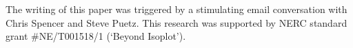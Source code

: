 \documentclass[gchron, manuscript]{copernicus}
\begin{document}

\begin{acknowledgements}
  The writing of this paper was triggered by a stimulating email
  conversation with Chris Spencer and Steve Puetz. This research was
  supported by NERC standard grant \#NE/T001518/1 (`Beyond Isoplot').
\end{acknowledgements}



















\end{document}

